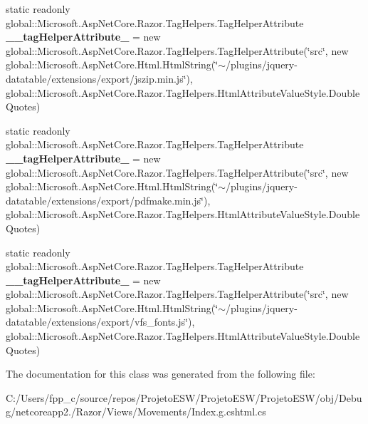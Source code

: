 \begin{DoxyCompactItemize}
static readonly global\+::\+Microsoft.\+Asp\+Net\+Core.\+Razor.\+Tag\+Helpers.\+Tag\+Helper\+Attribute {\bfseries \+\_\+\+\_\+tag\+Helper\+Attribute\+\_} = new global\+::\+Microsoft.\+Asp\+Net\+Core.\+Razor.\+Tag\+Helpers.\+Tag\+Helper\+Attribute(\char`\"{}src\char`\"{}, new global\+::\+Microsoft.\+Asp\+Net\+Core.\+Html.\+Html\+String(\char`\"{}$\sim$/plugins/jquery-\/datatable/extensions/export/jszip.\+min.\+js\char`\"{}), global\+::\+Microsoft.\+Asp\+Net\+Core.\+Razor.\+Tag\+Helpers.\+Html\+Attribute\+Value\+Style.\+Double\+Quotes)
\item 
\mbox{\label{class_asp_net_core_1_1_views___movements___index_a40887ee2ca992ffb670d437a2f883ba0}} 
static readonly global\+::\+Microsoft.\+Asp\+Net\+Core.\+Razor.\+Tag\+Helpers.\+Tag\+Helper\+Attribute {\bfseries \+\_\+\+\_\+tag\+Helper\+Attribute\+\_} = new global\+::\+Microsoft.\+Asp\+Net\+Core.\+Razor.\+Tag\+Helpers.\+Tag\+Helper\+Attribute(\char`\"{}src\char`\"{}, new global\+::\+Microsoft.\+Asp\+Net\+Core.\+Html.\+Html\+String(\char`\"{}$\sim$/plugins/jquery-\/datatable/extensions/export/pdfmake.\+min.\+js\char`\"{}), global\+::\+Microsoft.\+Asp\+Net\+Core.\+Razor.\+Tag\+Helpers.\+Html\+Attribute\+Value\+Style.\+Double\+Quotes)
\item 
\mbox{\label{class_asp_net_core_1_1_views___movements___index_a72d71a43b6b1ee9f490ba302568fa8aa}} 
static readonly global\+::\+Microsoft.\+Asp\+Net\+Core.\+Razor.\+Tag\+Helpers.\+Tag\+Helper\+Attribute {\bfseries \+\_\+\+\_\+tag\+Helper\+Attribute\+\_} = new global\+::\+Microsoft.\+Asp\+Net\+Core.\+Razor.\+Tag\+Helpers.\+Tag\+Helper\+Attribute(\char`\"{}src\char`\"{}, new global\+::\+Microsoft.\+Asp\+Net\+Core.\+Html.\+Html\+String(\char`\"{}$\sim$/plugins/jquery-\/datatable/extensions/export/vfs\+\_\+fonts.\+js\char`\"{}), global\+::\+Microsoft.\+Asp\+Net\+Core.\+Razor.\+Tag\+Helpers.\+Html\+Attribute\+Value\+Style.\+Double\+Quotes)
\end{DoxyCompactItemize}


The documentation for this class was generated from the following file\+:\begin{DoxyCompactItemize}
\item 
C\+:/\+Users/fpp\+\_\+c/source/repos/\+Projeto\+E\+S\+W/\+Projeto\+E\+S\+W/\+Projeto\+E\+S\+W/obj/\+Debug/netcoreapp2./\+Razor/\+Views/\+Movements/Index.\+g.\+cshtml.\+cs\end{DoxyCompactItemize}
